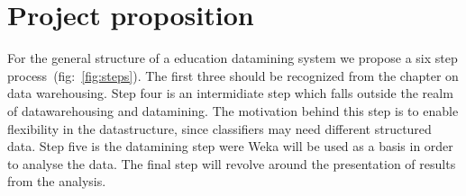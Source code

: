 \chapter{Project proposition}
	For the general structure of a education datamining system we propose 
	a six step process~(fig:~\ref{fig:steps}). 
	The first three should be recognized from the chapter on data warehousing. 
	Step four is an intermidiate step which falls outside the realm of datawarehousing and datamining. 
	The motivation behind this step is to enable flexibility in the datastructure, since classifiers may need different structured data.
	Step five is the datamining step were Weka will be used as a basis
	in order to analyse the data. 
	The final step will revolve around the presentation of results from the analysis. 
	

%
